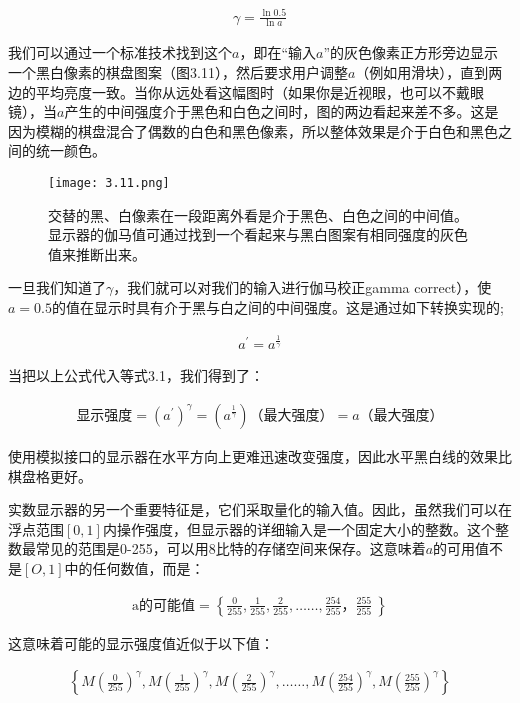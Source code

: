 \documentclass[lang=cn,12pt]{elegantbook}
\begin{document}
\[
  \begin{aligned}
    \gamma = \frac{\ln 0.5}{\ln a}
  \end{aligned}
\]

我们可以通过一个标准技术找到这个$a$，即在“输入$a$”的灰色像素正方形旁边显示一个黑白像素的棋盘图案（图3.11），然后要求用户调整$a$（例如用滑块），直到两边的平均亮度一致。当你从远处看这幅图时（如果你是近视眼，也可以不戴眼镜），当$a$产生的中间强度介于黑色和白色之间时，图的两边看起来差不多。这是因为模糊的棋盘混合了偶数的白色和黑色像素，所以整体效果是介于白色和黑色之间的统一颜色。

\begin{figure}[htb]
  \centering
  \texttt{[image: 3.11.png]}
  \caption{交替的黑、白像素在一段距离外看是介于黑色、白色之间的中间值。显示器的伽马值可通过找到一个看起来与黑白图案有相同强度的灰色值来推断出来。}
\end{figure}

一旦我们知道了$\gamma$，我们就可以对我们的输入进行伽马校正gamma correct），使$a=0.5$的值在显示时具有介于黑与白之间的中间强度。这是通过如下转换实现的;

\[
  \begin{aligned}
    a^{'} = a^{\frac{1}{\gamma } }
  \end{aligned}
\]

当把以上公式代入等式3.1，我们得到了：

\[
  \begin{aligned}
    \mbox{显示强度} = (a^{'})^\gamma = (a^{\frac{1}{\gamma}})\mbox{（最大强度）} = a\mbox{（最大强度）}
  \end{aligned}
\]

\begin{note}
  使用模拟接口的显示器在水平方向上更难迅速改变强度，因此水平黑白线的效果比棋盘格更好。
\end{note}

实数显示器的另一个重要特征是，它们采取量化的输入值。因此，虽然我们可以在浮点范围$[0,1]$内操作强度，但显示器的详细输入是一个固定大小的整数。这个整数最常见的范围是0-255，可以用8比特的存储空间来保存。这意味着$a$的可用值不是$[O,1]$中的任何数值，而是：

\[
  \begin{aligned}
    \mbox{a的可能值} = \left\{ \frac{0}{255},\frac{1}{255},\frac{2}{255},……,\frac{254}{255}，\frac{255}{255}\ \right\}
  \end{aligned}
\]

这意味着可能的显示强度值近似于以下值：

\[
  \begin{aligned}
    \left\{ M(\frac{0}{255})^\gamma ,M(\frac{1}{255})^\gamma ,M(\frac{2}{255})^\gamma ,……,M(\frac{254}{255})^\gamma ,M(\frac{255}{255})^\gamma \right\}
  \end{aligned}
\]
\end{document}
